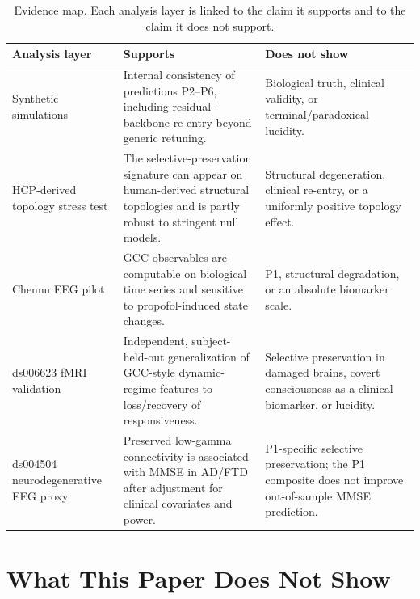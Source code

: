 \documentclass[11pt,a4paper]{article}
\theoremstyle{plain}
\theoremstyle{definition}
\theoremstyle{remark}
\begin{document}
\begin{table}[h]
\centering
\caption{Evidence map. Each analysis layer is linked to the claim it supports and to the claim it does not support.}
\label{tab:evidence-map}
\small
\begin{tabular}{p{3.1cm}p{4.2cm}p{5.4cm}}
\hline
Analysis layer & Supports & Does not show \\
\hline
Synthetic simulations & Internal consistency of predictions P2--P6, including residual-backbone re-entry beyond generic retuning. & Biological truth, clinical validity, or terminal/paradoxical lucidity. \\
HCP-derived topology stress test & The selective-preservation signature can appear on human-derived structural topologies and is partly robust to stringent null models. & Structural degeneration, clinical re-entry, or a uniformly positive topology effect. \\
Chennu EEG pilot & GCC observables are computable on biological time series and sensitive to propofol-induced state changes. & P1, structural degradation, or an absolute biomarker scale. \\
ds006623 fMRI validation & Independent, subject-held-out generalization of GCC-style dynamic-regime features to loss/recovery of responsiveness. & Selective preservation in damaged brains, covert consciousness as a clinical biomarker, or lucidity. \\
ds004504 neurodegenerative EEG proxy & Preserved low-gamma connectivity is associated with MMSE in AD/FTD after adjustment for clinical covariates and power. & P1-specific selective preservation; the P1 composite does not improve out-of-sample MMSE prediction. \\
\hline
\end{tabular}
\end{table}

\section{What This Paper Does Not Show}
\label{sec:not-show}
\end{document}
